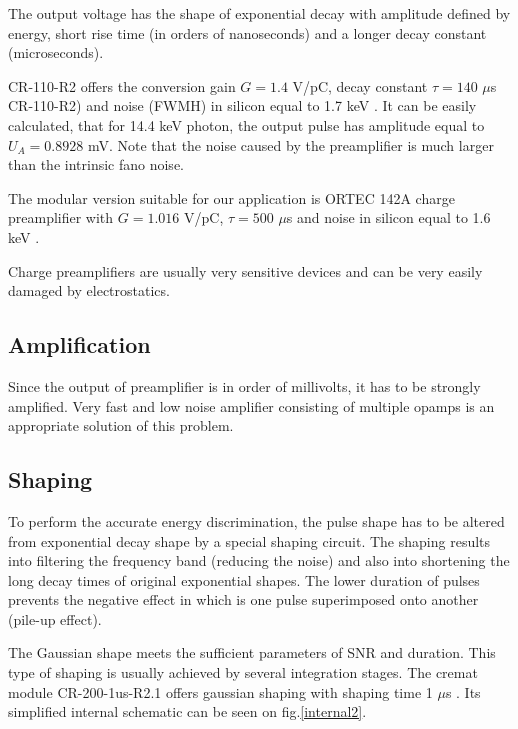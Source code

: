 The output voltage has the shape of exponential decay with amplitude defined by energy, short rise time (in orders of nanoseconds) and a longer decay constant (microseconds).


CR-110-R2 offers the conversion gain $G = 1.4$ V/pC, decay constant $\tau = 140$ $\mu$s CR-110-R2) and noise (FWMH) in silicon equal to 1.7 keV \cite{cr110}. It can be easily calculated, that for 14.4 keV photon, the output pulse has amplitude equal to $U_{A} = 0.8928$ mV. 
Note that the noise caused by the preamplifier is much larger than the intrinsic fano noise.


\par
The modular version suitable for our application is ORTEC 142A charge preamplifier with $G = 1.016$ V/pC, $\tau = 500$ $\mu$s and noise in silicon equal to 1.6 keV \cite{ORTECpreamp}.  






\par

Charge preamplifiers are usually very sensitive devices and can be very easily damaged by electrostatics. 




\par



\subsection{Amplification}
Since the output of preamplifier is in order of millivolts, it has to be strongly amplified. Very fast and low noise amplifier consisting of multiple opamps is an appropriate solution of this problem.



\subsection{Shaping}

To perform the accurate energy discrimination, the pulse shape has to be altered from exponential decay shape by a special shaping circuit. The shaping results into filtering the frequency band (reducing the noise) and also into shortening the long decay times of original exponential shapes. The lower duration of pulses prevents the negative effect in which is one pulse superimposed onto another (pile-up effect).

\par
The Gaussian shape meets the sufficient parameters of SNR and duration. This type of shaping is usually achieved by several integration stages. The cremat module CR-200-1us-R2.1 offers gaussian shaping with shaping time 1 $\mu$s \cite{cr200}. Its simplified internal schematic can be seen on fig.\ref{internal2}. 



